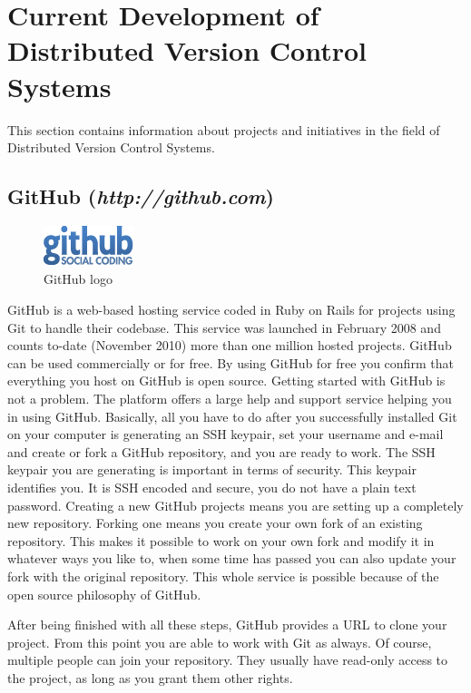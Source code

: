 \section{Current Development of Distributed Version Control Systems}

This section contains information about projects and initiatives in the field of Distributed Version Control Systems.

\subsection{GitHub (\textit{http://github.com})}
\begin{figure}[h]
  \centering 
  \includegraphics{img/github}
  \caption{GitHub logo}
  \label{}
\end{figure}
GitHub is a web-based hosting service coded in Ruby on Rails for projects using Git to handle their codebase. This service was launched in February 2008 and counts to-date (November 2010) more than one million hosted projects. GitHub can be used commercially or for free. By using GitHub for free you confirm that everything you host on GitHub is open source.
Getting started with GitHub is not a problem. The platform offers a large help and support service helping you in using GitHub.
Basically, all you have to do after you successfully installed Git on your computer is generating an SSH keypair, set your username and e-mail and create or fork a GitHub repository, and you are ready to work.
The SSH keypair you are generating is important in terms of security. This keypair identifies you. It is SSH encoded and secure, you do not have a plain text password.
Creating a new GitHub projects means you are setting up a completely new repository. Forking one means you create your own fork of an existing repository. This makes it possible to work on your own fork and modify it in whatever ways you like to, when some time has passed you can also update your fork with the original repository. This whole service is possible because of the open source philosophy of GitHub.

After being finished with all these steps, GitHub provides a URL to clone your project. From this point you are able to work with Git as always. Of course, multiple people can join your repository. They usually have read-only access to the project, as long as you grant them other rights.

